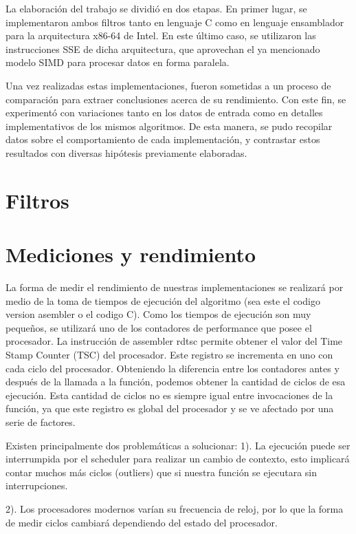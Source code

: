 \documentclass[a4paper]{article}
\begin{document}
  La elaboración del trabajo se dividió en dos etapas. En primer lugar, se implementaron ambos filtros tanto en lenguaje C como en lenguaje ensamblador para la arquitectura x86-64 de Intel. En este último caso, se utilizaron las instrucciones SSE de dicha arquitectura, que aprovechan el ya mencionado modelo SIMD para procesar datos en forma paralela.

  Una vez realizadas estas implementaciones, fueron sometidas a un proceso de comparación para extraer conclusiones acerca de su rendimiento. Con este fin, se experimentó con variaciones tanto en los datos de entrada como en detalles implementativos de los mismos algoritmos. De esta manera, se pudo recopilar datos sobre el comportamiento de cada implementación, y contrastar estos resultados con diversas hipótesis previamente elaboradas.
\section{Filtros}


%
%



\section{Mediciones y rendimiento}

La forma de medir el rendimiento de nuestras implementaciones se realizará por medio de la toma de tiempos de ejecución del algoritmo (sea este el codigo version asembler o el codigo C). Como los tiempos de ejecución son muy pequeños, se utilizará uno de los contadores de performance que posee el procesador.
La instrucción de assembler rdtsc permite obtener el valor del Time Stamp Counter (TSC) del procesador. Este registro se incrementa en uno con cada ciclo del procesador. Obteniendo la diferencia entre los contadores antes y después de la llamada a la función, podemos obtener la cantidad de ciclos de esa ejecución. Esta cantidad de ciclos no es siempre igual entre invocaciones de la función, ya que este registro es global del procesador y se ve afectado por una serie de factores. \newline

Existen principalmente dos problemáticas a solucionar:
1). La ejecución puede ser interrumpida por el scheduler para realizar un cambio de contexto,
esto implicará contar muchos más ciclos (outliers) que si nuestra función se ejecutara sin
interrupciones.

2). Los procesadores modernos varían su frecuencia de reloj, por lo que la forma de medir
ciclos cambiará dependiendo del estado del procesador.
\newline
\end{document}
